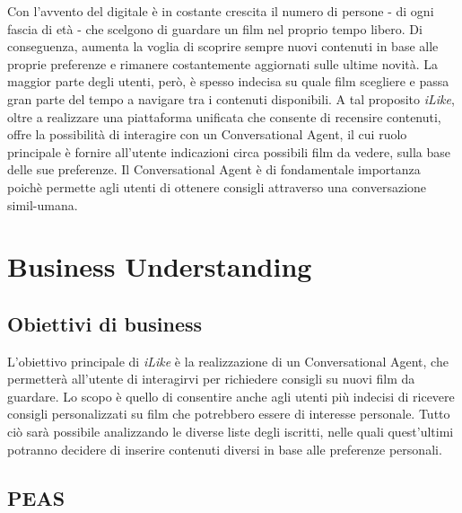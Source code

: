 \documentclass[a4paper, 10pt]{report}
\begin{document}
        Con l'avvento del digitale è in costante crescita il numero di persone - di ogni fascia di età - che scelgono
        di guardare un film nel proprio tempo libero. Di conseguenza, aumenta la voglia di scoprire sempre nuovi contenuti
        in base alle proprie preferenze e rimanere costantemente aggiornati sulle ultime novità. La maggior parte degli utenti,
        però, è spesso indecisa su quale film scegliere e passa gran parte del tempo a navigare tra i contenuti disponibili.
        A tal proposito \textit{iLike}, oltre a realizzare una piattaforma unificata che consente di recensire contenuti, offre
        la possibilità di interagire con un Conversational Agent, il cui ruolo principale è fornire all'utente indicazioni circa possibili
        film da vedere, sulla base delle sue preferenze.
        Il Conversational Agent è di fondamentale importanza poichè permette agli utenti di ottenere consigli attraverso una
        conversazione simil-umana.


    \chapter{Business Understanding}\label{ch:business-understanding}

        \section{Obiettivi di business}\label{sec:obiettivi-di-business}

            L'obiettivo principale di \textit{iLike} è la realizzazione di un Conversational Agent, che permetterà all'utente di
            interagirvi per richiedere consigli su nuovi film da guardare. Lo scopo è quello di consentire anche agli utenti più indecisi
            di ricevere consigli personalizzati su film che potrebbero essere di interesse personale.
            Tutto ciò sarà possibile analizzando le diverse liste degli iscritti, nelle quali quest'ultimi potranno decidere di inserire contenuti
            diversi in base alle preferenze personali.

        \section{PEAS}\label{sec:peas}
\end{document}
